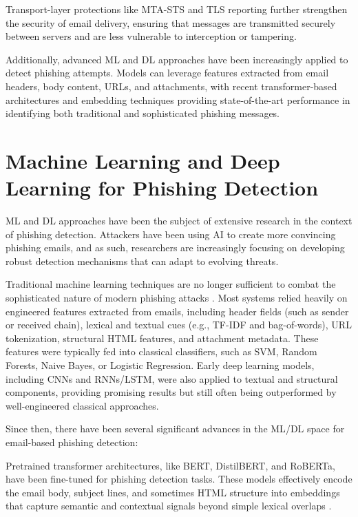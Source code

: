Transport-layer protections like \ac{MTA-STS} and \ac{TLS} reporting further strengthen the security of email delivery, ensuring that messages are transmitted securely between servers and are less vulnerable to interception or tampering.

Additionally, advanced \ac{ML} and \ac{DL} approaches have been increasingly applied to detect phishing attempts. Models can leverage features extracted from email headers, body content, URLs, and attachments, with recent transformer-based architectures and embedding techniques providing state-of-the-art performance in identifying both traditional and sophisticated phishing messages.

\section{Machine Learning and Deep Learning for Phishing Detection}

\ac{ML} and \ac{DL} approaches have been the subject of extensive research in the context of phishing detection.
Attackers have been using \ac{AI} to create more convincing phishing emails, and as such, researchers are increasingly focusing on developing robust detection mechanisms that can adapt to evolving threats.

Traditional machine learning techniques are no longer sufficient to combat the sophisticated nature of modern phishing attacks \cite{Fernandes2024}. Most systems relied heavily on engineered features extracted from emails, including header fields (such as sender or received chain), lexical and textual cues (e.g., \ac{TF-IDF} and bag-of-words), URL tokenization, structural HTML features, and attachment metadata. These features were typically fed into classical classifiers, such as \ac{SVM}, Random Forests, Naive Bayes, or Logistic Regression. Early deep learning models, including \acp{CNN} and \acp{RNN}/\ac{LSTM}, were also applied to textual and structural components, providing promising results but still often being outperformed by well-engineered classical approaches. 

Since then, there have been several significant advances in the \ac{ML}/\ac{DL} space for email-based phishing detection:

Pretrained transformer architectures, like \ac{BERT}, \ac{DistilBERT}, and \ac{RoBERTa}, have been fine-tuned for phishing detection tasks. These models effectively encode the email body, subject lines, and sometimes HTML structure into embeddings that capture semantic and contextual signals beyond simple lexical overlaps \cite{uddin2025}.

